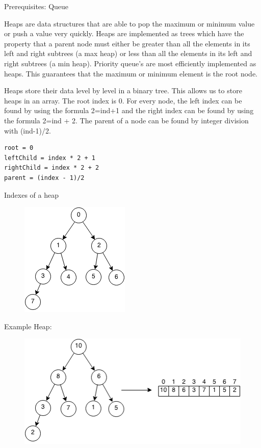 \documentclass[11pt,oneside]{book}
\makeatletter
\def\maxwidth#1{\ifdim\Gin@nat@width>#1 #1\else\Gin@nat@width\fi}
\makeatother
\begin{document}
Prerequisites: Queue



Heaps are data structures that are able to pop the maximum or minimum value or push a value very quickly. Heaps are implemented as trees which have the property that a parent node must either be greater than all the elements in its left and right subtrees (a max heap) or less than all the elements in its left and right subtrees (a min heap). Priority queue's are most efficiently implemented as heaps. This guarantees that the maximum or minimum element is the root node.

Heaps store their data level by level in a binary tree. This allows us to store heaps in an array. The root index is 0. For every node, the left index can be found by using the formula 2=ind+1 and the right index can be found by using the formula 2=ind + 2. The parent of a node can be found by integer division with (ind-1)/2.

\begin{lstlisting}
root = 0
leftChild = index * 2 + 1
rightChild = index * 2 + 2
parent = (index - 1)/2
\end{lstlisting}

Indexes of a heap

\vspace{5px}\begin{figure}[H]\centering
        \includegraphics[width=0.66\maxwidth{\textwidth}]{maxheap2.png}
        \end{figure}

Example Heap:

\vspace{5px}\begin{figure}[H]\centering
        \includegraphics[width=0.66\maxwidth{\textwidth}]{maxheap.png}
        \end{figure}
\end{document}
